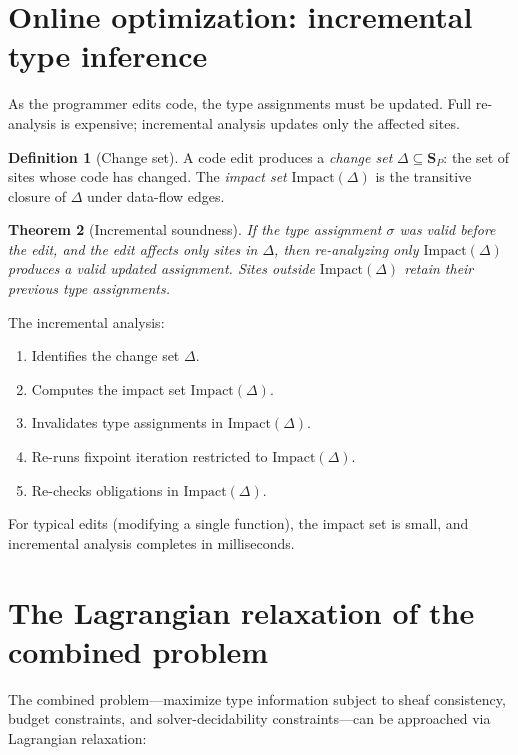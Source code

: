\documentclass[11pt]{report}
\theoremstyle{definition}
\newtheorem{definition}{Definition}[section]
\theoremstyle{plain}
\newtheorem{theorem}[definition]{Theorem}
\begin{document}
\section{Online optimization: incremental type inference}

As the programmer edits code, the type assignments must be updated. Full
re-analysis is expensive; incremental analysis updates only the affected
sites.

\begin{definition}[Change set]
A code edit produces a \emph{change set} $\Delta \subseteq \mathbf{S}_P$:
the set of sites whose code has changed. The \emph{impact set}
$\mathrm{Impact}(\Delta)$ is the transitive closure of $\Delta$ under
data-flow edges.
\end{definition}

\begin{theorem}[Incremental soundness]
If the type assignment $\sigma$ was valid before the edit, and the edit
affects only sites in $\Delta$, then re-analyzing only
$\mathrm{Impact}(\Delta)$ produces a valid updated assignment. Sites
outside $\mathrm{Impact}(\Delta)$ retain their previous type assignments.
\end{theorem}

The incremental analysis:
\begin{enumerate}[nosep]
  \item Identifies the change set $\Delta$.
  \item Computes the impact set $\mathrm{Impact}(\Delta)$.
  \item Invalidates type assignments in $\mathrm{Impact}(\Delta)$.
  \item Re-runs fixpoint iteration restricted to $\mathrm{Impact}(\Delta)$.
  \item Re-checks obligations in $\mathrm{Impact}(\Delta)$.
\end{enumerate}

For typical edits (modifying a single function), the impact set is small,
and incremental analysis completes in milliseconds.

\section{The Lagrangian relaxation of the combined problem}

The combined problem---maximize type information subject to sheaf
consistency, budget constraints, and solver-decidability constraints---can be
approached via Lagrangian relaxation:
\end{document}
